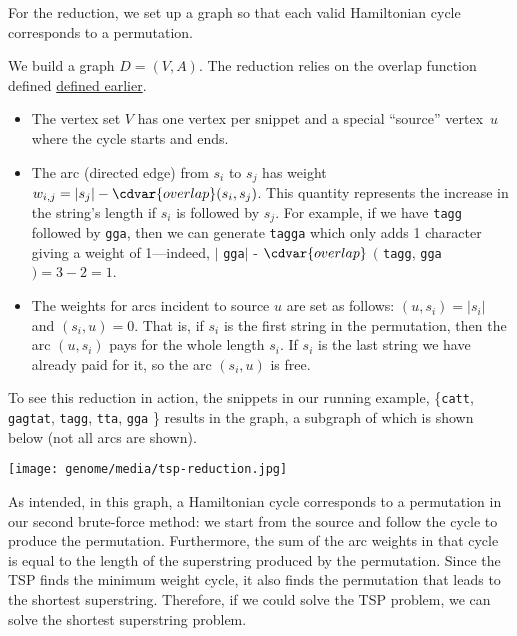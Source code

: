 \begin{gram}
For the reduction, we set up a graph so that each valid Hamiltonian cycle
corresponds to a permutation.  

%
We build a graph $D = (V, A)$.
%
The reduction relies on the overlap function defined
\href{def:genome::prob::overlap}{defined earlier}.

\begin{itemize}
\item The vertex set $V$ has one vertex per snippet and a special
  ``source'' vertex~$u$ where the cycle starts and ends.

\item The arc (directed edge) from $s_i $ to $s_j$ has weight $w_{i,j}
  = |s_j| - \cdvar{overlap}(s_i, s_j)$. 
%
 This quantity represents the increase
  in the string's length if $s_i$ is followed by $s_j$. 
%
  For example, if we have \texttt{tagg} followed by
  \texttt{gga}, then we can generate \texttt{tagga} which only
  adds 1 character giving a weight of 1---indeed,
  $|$ \texttt{gga}$|$ -
  $\cdvar{overlap}$ $($ \texttt{tagg}, \texttt{gga} $) = 3 -
  2 = 1$.

\item The weights for arcs incident to source $u$ are set as follows:
  $(u, s_i) = |s_i|$ and $(s_i, u) = 0$.  That is, if
  $s_i$ is the first string in the permutation, then the arc
  $(u, s_i)$ pays for the whole length $s_i$.  If $s_i$ is the
  last string we have already paid for it, so the arc $(s_i, u)$
  is free.
\end{itemize}
\end{gram}

\begin{example}
To see this reduction in action, the snippets in our running example,
%
\{\texttt{catt}, \texttt{gagtat}, \texttt{tagg},
  \texttt{tta}, \texttt{gga} \} 
%
results in the graph, a subgraph of which is shown below (not all arcs
are shown).

\begin{center}
\texttt{[image: genome/media/tsp-reduction.jpg]}
\end{center}



As intended, in this graph, a Hamiltonian cycle corresponds to
a permutation in our second brute-force method: we start from the source and
follow the cycle to produce the permutation.
%
Furthermore, the sum of the arc weights in that cycle is equal to the
length of the superstring produced by the permutation.
%
Since the TSP finds the minimum weight cycle, it also finds the
permutation that leads to the shortest superstring.
%
Therefore, if we could solve the TSP problem, we can solve the
shortest superstring problem.
%
\end{example}

